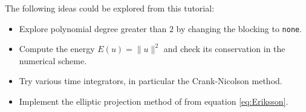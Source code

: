 \documentclass[a4paper,12pt]{article}
\begin{document}
The following ideas could be explored from this tutorial:
\begin{itemize}
\item Explore polynomial degree greater than $2$ by changing the blocking
to \lstinline{none}.
\item Compute the energy $E(u) = \|u\|^2$ and check its conservation in
the numerical scheme.
\item Try various time integrators, in particular the Crank-Nicolson method.
\item Implement the elliptic projection method of \cite{Eriksson} from
equation \eqref{eq:Eriksson}.
\end{itemize}



\end{document}
